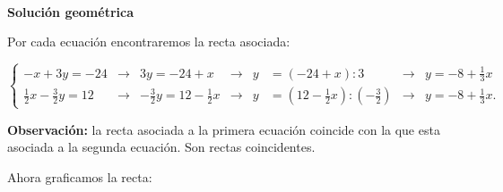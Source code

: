 \documentclass[11pt]{article}
\newcommand{\n}{\mathbb{N}}
\begin{document}
\begin{enumerate}[\hspace{-5mm} 1) ]
\begin{enumerate}[a)]
\begin{enumerate}[a)]
\begin{enumerate}[i)]
\, \\


{\bf Solución geométrica}


Por cada ecuación  encontraremos la recta asociada:
\bigskip

\hspace{-4mm}
$\left \{ \begin{array}{ lcccrlccl}
  -x+3y= -24  &\longrightarrow&   3 y = -24+x  &\longrightarrow& y & = (-24+x ):3  &\longrightarrow& \boxed{y =  -8 + \tfrac{1}{3} x} 
\\[4mm]%
\tfrac{1}{2} x - \tfrac{3}{2} y = 12 &\longrightarrow&  - \tfrac{3}{2} y = 12 -\tfrac{1}{2} x  & \longrightarrow & y &= (12 -\tfrac{1}{2} x ): \left(-\frac{3}{2} \right) & \longrightarrow &\boxed{ y =  -8 + \tfrac{1}{3} x .}
\end{array}\right. $









\bigskip
\textbf{Observación:} la recta asociada a la primera ecuación coincide con la que esta asociada a la segunda ecuación. Son rectas coincidentes.

Ahora graficamos la recta:



\begin{minipage}{.5\textwidth}
\begin{center}
    

 

\end{center}
\end{minipage}
\end{enumerate}
\end{enumerate}
\end{enumerate}
\end{enumerate}
\end{document}
